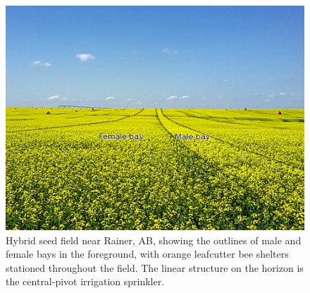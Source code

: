 \begin{figure}[h]
    \centering
    \includegraphics[width=\textwidth,keepaspectratio=true]{seedfieldBays.jpg}
    \caption[Hybrid seed field production field near Rainer, AB]{Hybrid seed field near Rainer, AB, showing the outlines of male and female bays in the foreground, with orange leafcutter bee shelters stationed throughout the field. The linear structure on the horizon is the central-pivot irrigation sprinkler.}
    \label{fig:seedfieldPhoto}
\end{figure}

